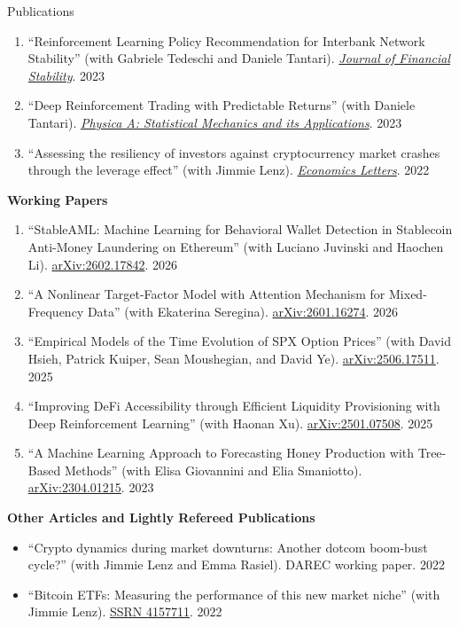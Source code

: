 \documentclass{resume} %
\begin{document}
\begin{rSection}{Publications}
\begin{enumerate}[leftmargin=1.9em,itemsep=0.45em,topsep=0.15em,label=\arabic*.]
\item ``Reinforcement Learning Policy Recommendation for Interbank Network Stability'' (with Gabriele Tedeschi and Daniele Tantari). \href{https://doi.org/10.1016/j.jfs.2023.101139}{\emph{Journal of Financial Stability}}. \hfill 2023
\item ``Deep Reinforcement Trading with Predictable Returns'' (with Daniele Tantari). \href{https://doi.org/10.1016/j.physa.2023.128901}{\emph{Physica A: Statistical Mechanics and its Applications}}. \hfill 2023
\item ``Assessing the resiliency of investors against cryptocurrency market crashes through the leverage effect'' (with Jimmie Lenz). \href{https://doi.org/10.1016/j.econlet.2022.110885}{\emph{Economics Letters}}. \hfill 2022
\end{enumerate}

\smallskip
{\bf Working Papers} \\[0.3em]
\begin{enumerate}[leftmargin=1.9em,itemsep=0.45em,topsep=0.15em,label=\arabic*.]
\item ``StableAML: Machine Learning for Behavioral Wallet Detection in Stablecoin Anti-Money Laundering on Ethereum'' (with Luciano Juvinski and Haochen Li). \href{https://arxiv.org/abs/2602.17842}{arXiv:2602.17842}. \hfill 2026
\item ``A Nonlinear Target-Factor Model with Attention Mechanism for Mixed-Frequency Data'' (with Ekaterina Seregina). \href{https://arxiv.org/abs/2601.16274}{arXiv:2601.16274}. \hfill 2026
\item ``Empirical Models of the Time Evolution of SPX Option Prices'' (with David Hsieh, Patrick Kuiper, Sean Moushegian, and David Ye). \href{https://arxiv.org/abs/2506.17511}{arXiv:2506.17511}. \hfill 2025
\item ``Improving DeFi Accessibility through Efficient Liquidity Provisioning with Deep Reinforcement Learning'' (with Haonan Xu). \href{https://arxiv.org/abs/2501.07508}{arXiv:2501.07508}. \hfill 2025
\item ``A Machine Learning Approach to Forecasting Honey Production with Tree-Based Methods'' (with Elisa Giovannini and Elia Smaniotto). \href{https://arxiv.org/abs/2304.01215}{arXiv:2304.01215}. \hfill 2023
\end{enumerate}

\smallskip
{\bf Other Articles and Lightly Refereed Publications} \\[0.3em]
\begin{itemize}[leftmargin=1.9em,itemsep=0.35em,topsep=0.15em,label=$\cdot$]
\item ``Crypto dynamics during market downturns: Another dotcom boom-bust cycle?'' (with Jimmie Lenz and Emma Rasiel). DAREC working paper. \hfill 2022
\item ``Bitcoin ETFs: Measuring the performance of this new market niche'' (with Jimmie Lenz). \href{https://papers.ssrn.com/sol3/papers.cfm?abstract_id=4157711}{SSRN 4157711}. \hfill 2022
\end{itemize}

\end{rSection}
\end{document}
